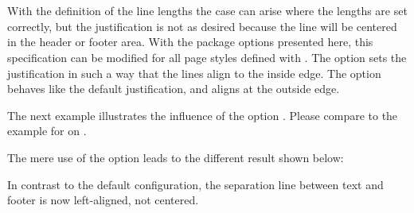 \begin{Declaration}
\\
\\
\end{Declaration}%
%
%
%
%
With the definition of the line lengths the case can arise where the
lengths are set correctly, but the justification is not as desired
because the line will be centered in the header or footer area.  With
the package options presented here, this specification can be modified
for all page styles defined with .  The option
 sets the justification in such a way that the lines
align to the inside edge.  The option  behaves like the
default justification, and  aligns at the outside edge.

\begin{Example}
  The next example illustrates the influence of the
  option . Please compare to the example for
   on .
\begin{lstcode}
  \usepackage[ilines]{scrpage2}
  \setfootbotline{2pt}  
  \setfootsepline[text]{.4pt}
\end{lstcode}
  The mere use of the option  leads to the different
  result shown below:
\begin{XmpBotPage}
        \thinlines{}
        \thicklines{}
\end{XmpBotPage}
  In contrast to the default configuration, the separation line between
  text and footer is now left-aligned, not centered.%
\end{Example}%
%
%
%



